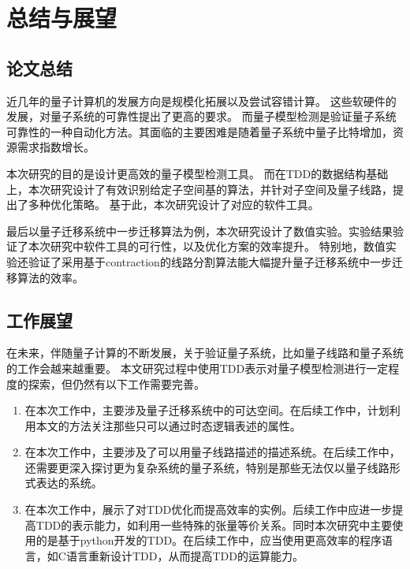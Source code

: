 \chapter{总结与展望}
\section{论文总结}
近几年的量子计算机的发展方向是规模化拓展以及尝试容错计算。
这些软硬件的发展，对量子系统的可靠性提出了更高的要求。
而量子模型检测是验证量子系统可靠性的一种自动化方法。其面临的主要困难是随着量子系统中量子比特增加，资源需求指数增长。

本次研究的目的是设计更高效的量子模型检测工具。
而在TDD的数据结构基础上，本次研究设计了有效识别给定子空间基的算法，并针对子空间及量子线路，提出了多种优化策略。
基于此，本次研究设计了对应的软件工具。

最后以量子迁移系统中一步迁移算法为例，本次研究设计了数值实验。实验结果验证了本次研究中软件工具的可行性，以及优化方案的效率提升。
特别地，数值实验还验证了采用基于contraction的线路分割算法能大幅提升量子迁移系统中一步迁移算法的效率。


\section{工作展望}

在未来，伴随量子计算的不断发展，关于验证量子系统，比如量子线路和量子系统的工作会越来越重要。
本文研究过程中使用TDD表示对量子模型检测进行一定程度的探索，但仍然有以下工作需要完善。
\begin{enumerate}
    \item 在本次工作中，主要涉及量子迁移系统中的可达空间。在后续工作中，计划利用本文的方法关注那些只可以通过时态逻辑表述的属性。
    \item 在本次工作中，主要涉及了可以用量子线路描述的描述系统。在后续工作中，还需要更深入探讨更为复杂系统的量子系统，特别是那些无法仅以量子线路形式表达的系统。
    \item 在本次工作中，展示了对TDD优化而提高效率的实例。后续工作中应进一步提高TDD的表示能力，如利用一些特殊的张量等价关系。同时本次研究中主要使用的是基于python开发的TDD。在后续工作中，应当使用更高效率的程序语言，如C语言重新设计TDD，从而提高TDD的运算能力。
\end{enumerate}


